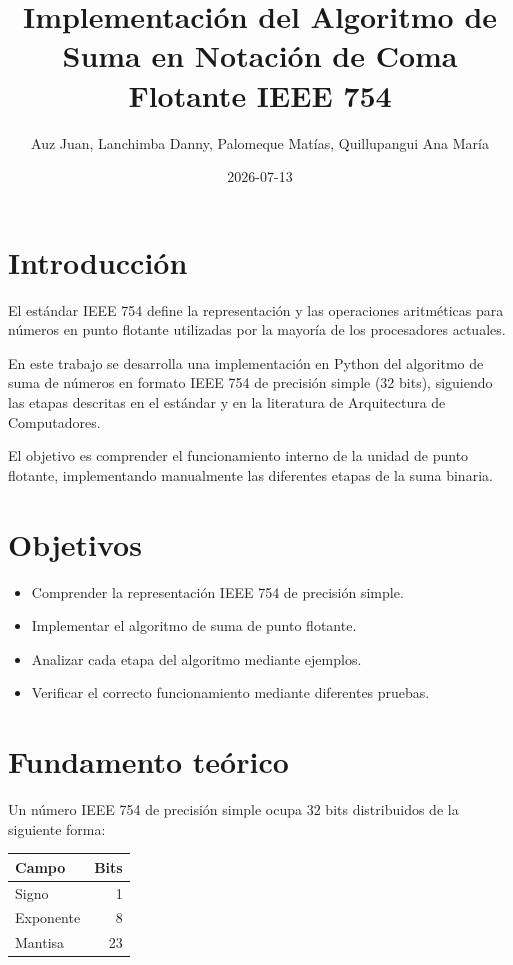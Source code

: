 \documentclass[11pt]{article}
\author{Auz Juan, Lanchimba Danny, Palomeque Matías, Quillupangui Ana María}
\date{2026-07-13}
\title{Implementación del Algoritmo de Suma en Notación de Coma Flotante IEEE 754}
\begin{document}
\maketitle
\tableofcontents


\section{Introducción}
\label{sec:orgdb9734f}

El estándar IEEE 754 define la representación y las operaciones
aritméticas para números en punto flotante utilizadas por la mayoría de
los procesadores actuales.

En este trabajo se desarrolla una implementación en Python del algoritmo
de suma de números en formato IEEE 754 de precisión simple (32 bits),
siguiendo las etapas descritas en el estándar y en la literatura de
Arquitectura de Computadores.

El objetivo es comprender el funcionamiento interno de la unidad de
punto flotante, implementando manualmente las diferentes etapas de
la suma binaria.

\section{Objetivos}
\label{sec:orgf386c56}

\begin{itemize}
\item Comprender la representación IEEE 754 de precisión simple.
\item Implementar el algoritmo de suma de punto flotante.
\item Analizar cada etapa del algoritmo mediante ejemplos.
\item Verificar el correcto funcionamiento mediante diferentes pruebas.
\end{itemize}

\section{Fundamento teórico}
\label{sec:orgbe367e5}

Un número IEEE 754 de precisión simple ocupa 32 bits distribuidos de la
siguiente forma:

\begin{center}
\begin{tabular}{lr}
Campo & Bits\\[0pt]
\hline
Signo & 1\\[0pt]
Exponente & 8\\[0pt]
Mantisa & 23\\[0pt]
\end{tabular}
\end{center}
\end{document}
